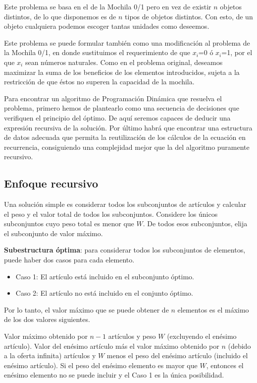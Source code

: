 Este problema se basa en el de la Mochila 0/1 pero en vez de existir $n$ objetos distintos, de lo que disponemos es de $n$ tipos de objetos distintos. Con esto, de un objeto cualquiera podemos escoger tantas unidades como deseemos.

Este problema se puede formular también como una modificación al problema
de la Mochila 0/1, en donde sustituimos el requerimiento de que $x_{i}$=0 ó $x_{i}$=1,
por el que $x_{i}$ sean números naturales. Como en el problema original, deseamos
maximizar la suma de los beneficios de los elementos introducidos, sujeta a la
restricción de que éstos no superen la capacidad de la mochila.

Para encontrar un algoritmo de Programación Dinámica que resuelva el problema, primero hemos de plantearlo como una secuencia de decisiones que verifiquen el principio del óptimo. De aquí seremos capaces de deducir una expresión recursiva de la solución. Por último habrá que encontrar una estructura de datos adecuada que permita la reutilización de los cálculos de la ecuación en recurrencia, consiguiendo una complejidad mejor que la del algoritmo puramente recursivo.

\subsection{Enfoque recursivo}
Una solución simple es considerar todos los subconjuntos de artículos y calcular el peso y el valor total de todos los subconjuntos. Considere los únicos subconjuntos cuyo peso total es menor  que $W$. De todos esos subconjuntos, elija el subconjunto de valor máximo.

\textbf{Subestructura óptima}: para considerar todos los subconjuntos de elementos, puede haber dos casos para cada elemento.

\begin{itemize}
	\item Caso 1: El artículo está incluido en el subconjunto óptimo.
	\item Caso 2: El artículo no está incluido en el conjunto óptimo.
\end{itemize}

Por lo tanto, el valor máximo que se puede obtener de $n$ elementos es el máximo de los dos valores siguientes.

Valor máximo obtenido por $n-1$ artículos y peso $W$ (excluyendo el enésimo artículo). Valor del enésimo artículo más el valor máximo obtenido por $n$ (debido a la oferta infinita) artículos y $W$ menos el peso del enésimo artículo (incluido el enésimo artículo). Si el peso del enésimo elemento es mayor que $W$, entonces el enésimo elemento no se puede incluir y el Caso 1 es la única posibilidad.

